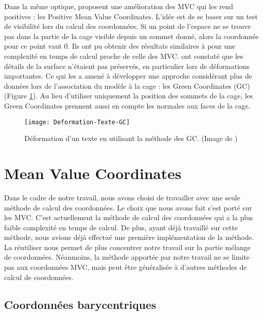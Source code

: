 Dans la même optique, \cite{LKCL07} proposent une amélioration des MVC qui les
rend positives : les Positive Mean Value Coordinates. L'idée est de se baser
sur un test de visibilité lors du calcul des coordonnées. Si un point de
l'espace ne se trouve pas dans la partie de la cage visible depuis un sommet
donné, alors la coordonnée pour ce point vaut 0. Ils ont pu obtenir des
résultats similaires à \cite{JMDGS07} pour une complexité en temps de calcul
proche de celle des MVC. \cite{LLC08} ont constaté que les détails de la
surface n'étaient pas préservés, en particulier lors de déformations
importantes. Ce qui les a amené à développer une approche considérant plus de
données lors de l'association du modèle à la cage : les Green Coordinates (GC)
(Figure \ref{DEFGre}). Au lieu d'utiliser uniquement la position des sommets
de la cage, les Green Coordinates prennent aussi en compte les normales aux
faces de la cage.

\begin{figure}[ht]
\begin{center}
\texttt{[image: Deformation-Texte-GC]}

\caption[Déformation d'un texte (GC)] {Déformation d'un texte en utilisant la
méthode des GC. (Image de \cite{LLC08})}

\label{DEFGre}
\end{center}
\end{figure}

\section{Mean Value Coordinates}

Dans le cadre de notre travail, nous avons choisi de travailler avec une seule
méthode de calcul des coordonnées. Le choix que nous avons fait s'est porté
sur les MVC. C'est actuellement la méthode de calcul des coordonnées qui a la
plus faible complexité en temps de calcul. De plus, ayant déjà travaillé sur
cette méthode, nous avions déjà effectué une première implémentation de la
méthode. La réutiliser nous permet de plus concentrer notre travail sur la
partie mélange de coordonnées. Néanmoins, la méthode apportée par notre
travail ne se limite pas aux coordonnées MVC, mais peut être généralisée à
d'autres méthodes de calcul de coordonnées.

\subsection{Coordonnées barycentriques}

